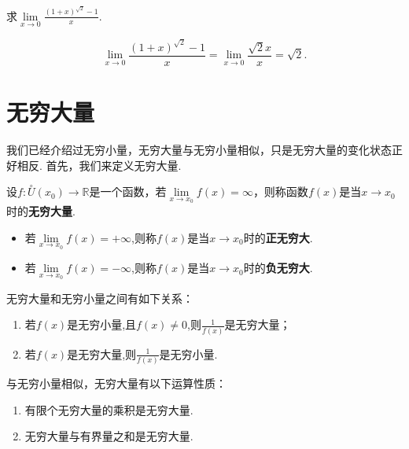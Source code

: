 	\begin{example}
		求$\lim\limits_{x\to 0}\frac{(1+x)^{\sqrt{2} }-1 }{x} .$
	\end{example}
	\begin{solution}
		\[
		\lim\limits_{x\to 0}\frac{(1+x)^{\sqrt{2} }-1 }{x}=\lim_{x\to 0}\frac{\sqrt{2}x}{x}=\sqrt{2}.
		\]
	\end{solution}

	\section{无穷大量}
	我们已经介绍过无穷小量，无穷大量与无穷小量相似，只是无穷大量的变化状态正好相反.
	首先，我们来定义无穷大量.
	
	\begin{definition}
		设$f:\overset{\circ}{U}(x_0)\to \mathbb{R}$是一个函数，若$\lim\limits_{x\to x_0}f(x)=\infty$，则称函数$f(x)$是当$x\to x_0$时的\textbf{无穷大量}.
	\end{definition}
	\begin{itemize}
		\item 若$\lim\limits_{x\to x_0}f(x)=+\infty$,则称$f(x)$是当$x\to x_0$时的\textbf{正无穷大}.
		\item 若$\lim\limits_{x\to x_0}f(x)=-\infty$,则称$f(x)$是当$x\to x_0$时的\textbf{负无穷大}.
	\end{itemize}
	
	无穷大量和无穷小量之间有如下关系：
	\begin{theorem}
		\begin{enumerate}
			\item 若$f(x)$是无穷小量,且$f(x)\ne 0$,则$\frac{1}{f(x)}$是无穷大量；
			\item 若$f(x)$是无穷大量,则$\frac{1}{f(x)}$是无穷小量.
		\end{enumerate}
	\end{theorem}

	与无穷小量相似，无穷大量有以下运算性质：
	\begin{theorem}
	\begin{enumerate}
		\item 有限个无穷大量的乘积是无穷大量.
		\item 无穷大量与有界量之和是无穷大量.
	\end{enumerate}
	\end{theorem}